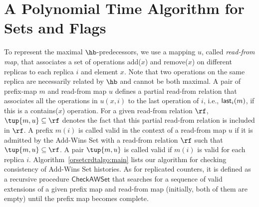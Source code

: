 
\section{A Polynomial Time Algorithm for Sets and Flags}
\label{sec:ptime:sets:appendix}

To represent the maximal $\hb$-predecessors, we use a mapping $u$, called \emph{read-from map}, that associates a set of operations {\sf add}($x$) and {\sf remove}($x$) on different replicas to each replica $i$ and element $x$. Note that two operations on the same replica are necessarily related by $\hb$ and cannot be both maximal. A pair of prefix-map $m$ and read-from map $u$ defines a partial read-from relation that associates all the operations in $u(x,i)$ to the last operation of $i$, i.e., ${\sf last}_i(m)$, if this is a {\sf contains}($x$) operation. For a given read-from relation $\rf$, $\tup{m,u}\subseteq \rf$ denotes the fact that this partial read-from relation is included in $\rf$. A prefix $m(i)$ is called valid in the context of a read-from map $u$ if it is admitted by the Add-Wins Set with a read-from relation $\rf$ such that $\tup{m,u}\subseteq \rf$. A pair $\tup{m,u}$ is called valid if $m(i)$ is valid for each replica $i$.
Algorithm~\ref{orsetcrdtalgo:main} lists our algorithm for checking consistency of Add-Wins Set histories. As for replicated counters, it is defined as a recursive procedure $\mathsf{CheckAWSet}$ that searches for a sequence of valid extensions of a given prefix map and read-from map (initially, both of them are empty) until the prefix map becomes complete.

